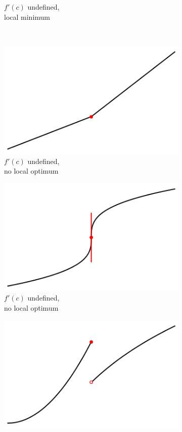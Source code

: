 \documentclass[11pt]{article}
\theoremstyle{definition} %
\begin{document}
\begin{figure}[h]
\begin{subfigure}{0.3\textwidth}
		\caption{$f'(c)$ undefined,\\local minimum}
	\end{subfigure}
	\\
	\begin{subfigure}{0.3\textwidth}
		\centering
		\includegraphics[width=\textwidth]{figures/cp04.png}
		\caption{$f'(c)$ undefined,\\no local optimum}
	\end{subfigure}
	\hfill
	\begin{subfigure}{0.3\textwidth}
		\centering
		\includegraphics[width=\textwidth]{figures/cp05.png}
		\caption{$f'(c)$ undefined,\\no local optimum}
	\end{subfigure}
	\hfill
	\begin{subfigure}{0.3\textwidth}
		\centering
		\includegraphics[width=\textwidth]{figures/cp06.png}

\end{subfigure}
\end{figure}
\end{document}
